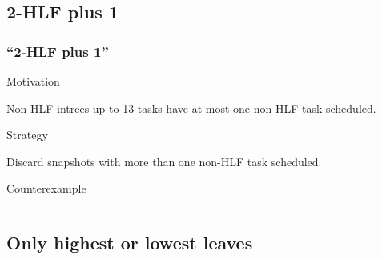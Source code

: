 \documentclass{beamer}
\newenvironment{strategyblock}
{
  \begin{block}{Strategy}
}
{
  \end{block}
}
\newenvironment{motivationblock}
{
  \begin{block}{Motivation}
}
{
  \end{block}
}
\newenvironment{counterexampleblock}
{
  \begin{alertblock}{Counterexample}
}
{
  \end{alertblock}
}
\begin{document}
\subsection{2-HLF plus 1}

\begin{frame}
  \frametitle{``2-HLF plus 1''}
  \begin{motivationblock}
    Non-HLF intrees up to 13 tasks have at most one non-HLF task scheduled.
  \end{motivationblock}
  \begin{strategyblock}
    Discard snapshots with more than one non-HLF task scheduled.
  \end{strategyblock}
  \begin{counterexampleblock}
    \begin{columns}
      \begin{column}{.5\textwidth}
        
      \end{column}
      \begin{column}{.5\textwidth}
              
      \end{column}
    \end{columns}
  \end{counterexampleblock}
\end{frame}

\subsection{Only highest or lowest leaves}
\end{document}
